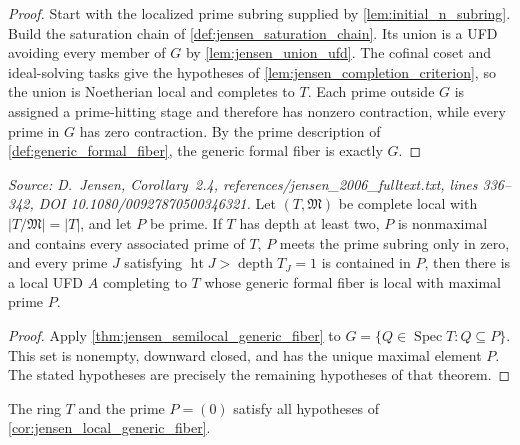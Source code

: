 \begin{proof}
  Start with the localized prime subring supplied by
  \cref{lem:initial_n_subring}.  Build the saturation chain of
  \cref{def:jensen_saturation_chain}.  Its union is a UFD avoiding every
  member of \(G\) by \cref{lem:jensen_union_ufd}.  The cofinal coset and
  ideal-solving tasks give the hypotheses of
  \cref{lem:jensen_completion_criterion}, so the union is Noetherian local
  and completes to \(T\).  Each prime outside \(G\) is assigned a
  prime-hitting stage and therefore has nonzero contraction, while every
  prime in \(G\) has zero contraction.  By the prime description of
  \cref{def:generic_formal_fiber}, the generic formal fiber is exactly \(G\).
\end{proof}

\begin{corollary}
  \label{cor:jensen_local_generic_fiber}
  \textit{Source: D.~Jensen, Corollary~2.4,
  references/jensen\_2006\_fulltext.txt, lines 336--342,
  DOI 10.1080/00927870500346321.}
  Let \((T,\mathfrak M)\) be complete local with
  \(|T/\mathfrak M|=|T|\), and let \(P\) be prime.  If \(T\) has depth at
  least two, \(P\) is nonmaximal and contains every associated prime of
  \(T\), \(P\) meets the prime subring only in zero, and every prime \(J\)
  satisfying \(\operatorname{ht}J>\operatorname{depth}T_J=1\) is contained
  in \(P\), then there is a local UFD \(A\) completing to \(T\) whose generic
  formal fiber is local with maximal prime \(P\).
\end{corollary}

\begin{proof}
  Apply \cref{thm:jensen_semilocal_generic_fiber} to
  \(G=\{Q\in\operatorname{Spec}T:Q\subseteq P\}\).  This set is nonempty,
  downward closed, and has the unique maximal element \(P\).  The stated
  hypotheses are precisely the remaining hypotheses of that theorem.
\end{proof}

\begin{lemma}
  \label{lem:node_jensen_hypotheses}
  The ring \(T\) and the prime \(P=(0)\) satisfy all hypotheses of
  \cref{cor:jensen_local_generic_fiber}.
\end{lemma}

